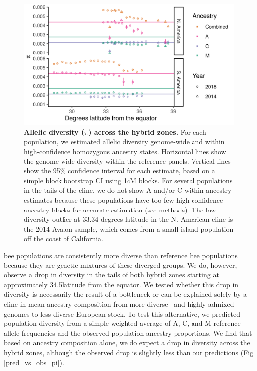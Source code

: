 \begin{figure}[ht]
\includegraphics[width=\textwidth]{chapter1/figures/pi_by_latitude.png}
\caption{
 \textbf{Allelic diversity ($\pi$) across the hybrid zones.} For each population, we estimated allelic diversity genome-wide and within high-confidence homozygous ancestry states. Horizontal lines show the genome-wide diversity within the reference panels. Vertical lines show the 95\% confidence interval for each estimate, based on a simple block bootstrap CI using 1cM blocks. For several populations in the tails of the cline, we do not show A and/or C within-ancestry estimates because these populations have too few high-confidence ancestry blocks for accurate estimation (see methods). The low diversity outlier at 33.34 degrees latitude in the N. American cline is the 2014 Avalon sample, which comes from a small island population off the coast of California.}
\label{pi_by_lat}
\end{figure}

 bee populations are consistently more diverse than reference bee populations because they are genetic mixtures of these diverged groups. We do, however, observe a drop in diversity in the tails of both hybrid zones starting at approximately 34.5\degree latitude from the equator. We tested whether this drop in diversity is necessarily the result of a bottleneck or can be explained solely by a cline in mean ancestry composition from more diverse \scutellata\ and highly admixed genomes to less diverse European stock. To test this alternative, we predicted population diversity from a simple weighted average of A, C, and M reference allele frequencies and the observed population ancestry proportions. We find that based on ancestry composition alone, we do expect a drop in diversity across the hybrid zones, although the observed drop is slightly less than our predictions (Fig \ref{pred_vs_obs_pi}).

